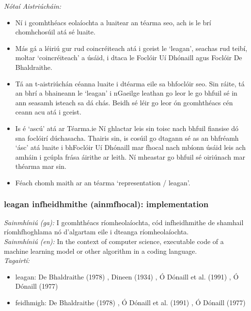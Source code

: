  \noindent \textit{Nótaí Aistriúcháin:}
\begin{itemize}
	\item Ní i gcomhthéacs eolaíochta a luaitear an téarma seo, ach is le brí chomhchosúil atá sé luaite.
	\item Más gá a léiriú gur rud coincréiteach atá i gceist le `leagan', seachas rud teibí, moltar `coincréiteach' a úsáid, i dtaca le Foclóir Uí Dhónaill agus Foclóir De Bhaldraithe.
	\item Tá an t-aistriúchán céanna luaite i dtéarma eile sa bhfoclóir seo. Sin ráite, tá an bhrí a bhaineann le `leagan' i nGaeilge leathan go leor le go bhfuil sé in ann seasamh isteach sa dá chás. Beidh sé léir go leor ón gcomhthéacs cén ceann acu atá i gceist.
	\item Is é `ascú' atá ar Téarma.ie Ní ghlactar leis sin toisc nach bhfuil fiansise dó sna foclóirí dúchasacha. Thairis sin, is cosúil go dtagann sé as an bhfréamh `ásc' atá luaite i bhFoclóir Uí Dhónaill mar fhocal nach mbíonn úsáid leis ach amháin i gcúpla frása áirithe ar leith. Ní mheastar go bhfuil sé  oiriúnach mar théarma mar sin.
	\item Féach chomh maith ar an téarma `representation / leagan'.
\end{itemize}


\subsubsection*{leagan infheidhmithe (ainmfhocal): implementation}
 \noindent \textit{Sainmhíniú (ga):} I gcomhthéacs ríomheolaíochta, cód infheidhmithe de shamhail ríomhfhoghlama nó d'algartam eile i dteanga ríomheolaíochta.
\\
 \noindent \textit{Sainmhíniú (en):} In the context of computer science, executable code of a machine learning model or other algorithm in a coding language.
\\
 \noindent \textit{Tagairtí:}
\begin{itemize}
	\item leagan: De Bhaldraithe (1978) \cite{de-bhaldraithe}, Dineen (1934) \cite{dineen}, Ó Dónaill et al. (1991) \cite{focloir-beag}, Ó Dónaill (1977) \cite{odonaill}
	\item feidhmigh: De Bhaldraithe (1978) \cite{de-bhaldraithe}, Ó Dónaill et al. (1991) \cite{focloir-beag}, Ó Dónaill (1977) \cite{odonaill}
\end{itemize}

